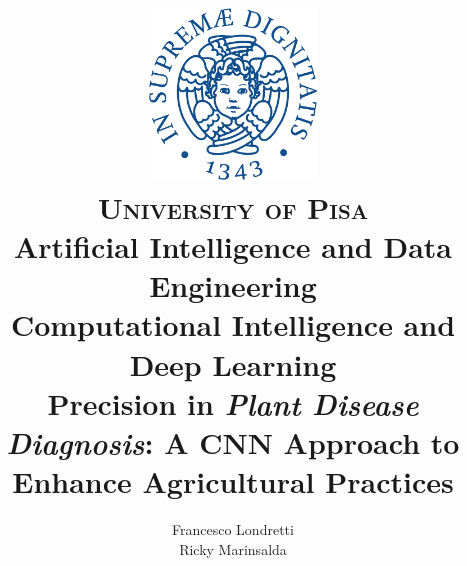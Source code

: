 \title{
	\includegraphics[width=0.333\textwidth]{assets/cherubino} \\
	\textsc{University of Pisa} \\
	\vspace{1cm}
	Artificial Intelligence and Data Engineering \\
	Computational Intelligence and Deep Learning \\
	\vspace{2cm}
	{\huge Precision in \textit{Plant Disease Diagnosis}: A CNN Approach to Enhance Agricultural Practices }
}


\author{
	\begin{tabular}{lr}
		Francesco Londretti  \\
		Ricky Marinsalda 
	\end{tabular}
}

\date{}
\maketitle